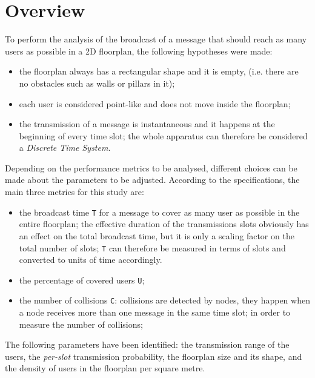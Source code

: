 %
\chapter{Overview}\label{overview}
To perform the analysis of the broadcast of a message that should reach as many
users as possible in a 2D floorplan, the following hypotheses were made:
\begin{itemize}
	\item the floorplan always has a rectangular shape and it is empty, (i.e.
	there are no obstacles such as walls or pillars in it);
	\item each user is considered point-like and does not move inside the
	floorplan;
	\item the transmission of a message is instantaneous and it happens at the
	beginning of every time slot; the whole apparatus can therefore be
	considered a \textit{Discrete Time System}.
\end{itemize}
Depending on the performance metrics to be analysed, different choices can be
made about the parameters to be adjusted. According to the specifications, the
main three metrics for this study are:
\begin{itemize}
	\item the broadcast time \colorbox{gray!30}{\large \texttt{T}} for a message
	to cover as many user as possible in the entire floorplan; the effective
	duration of the transmissions slots obviously has an effect
	on the total broadcast time, but it is only a scaling factor on the total
	number of slots; \texttt{T} can therefore be measured in terms of slots and
	converted to units of time accordingly.
	\item the percentage of covered users \colorbox{gray!30}{\large \texttt{U}};
	\item the number of collisions \colorbox{gray!30}{\large \texttt{C}}:
	collisions are detected by nodes, they happen when a node receives more than
	one message in the same time slot; in order to measure the number of
	collisions;
\end{itemize}
The following parameters have been identified: the transmission range of the
users, the \textit{per-slot} transmission probability, the floorplan size and
its shape, and the density of users in the floorplan per square metre.\\
